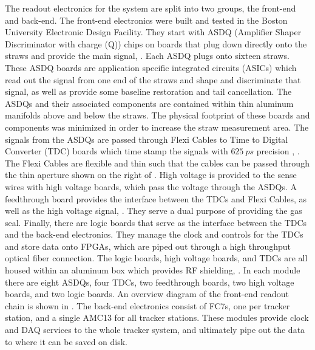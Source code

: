 The readout electronics for the system are split into two groups, the front-end and back-end. The front-end electronics were built and tested in the Boston University Electronic Design Facility. They start with ASDQ (Amplifier Shaper Discriminator with charge (Q)) chips on boards that plug down directly onto the straws and provide the main signal, . Each ASDQ plugs onto sixteen straws. These ASDQ boards are application specific integrated circuits (ASICs) which read out the signal from one end of the straws and shape and discriminate that signal, as well as provide some baseline restoration and tail cancellation. The ASDQs and their associated components are contained within thin aluminum manifolds above and below the straws. The physical footprint of these boards and components was minimized in order to increase the straw measurement area. The signals from the ASDQs are passed through Flexi Cables to Time to Digital Converter (TDC) boards which time stamp the signals with $\SI{625}{ps}$ precision \cite{WTThesis}, . The Flexi Cables are flexible and thin such that the cables can be passed through the thin aperture shown on the right of . High voltage is provided to the sense wires with high voltage boards, which pass the voltage through the ASDQs. A feedthrough board provides the interface between the TDCs and Flexi Cables, as well as the high voltage signal, . They serve a dual purpose of providing the gas seal. Finally, there are logic boards that serve as the interface between the TDCs and the back-end electronics. They manage the clock and controls for the TDCs and store data onto FPGAs, which are piped out through a high throughput optical fiber connection. The logic boards, high voltage boards, and TDCs are all housed within an aluminum box which provides RF shielding, . In each module there are eight ASDQs, four TDCs, two feedthrough boards, two high voltage boards, and two logic boards. An overview diagram of the front-end readout chain is shown in . The back-end electronics consist of FC7s, one per tracker station, and a single AMC13 for all tracker stations. These modules provide clock and DAQ services to the whole tracker system, and ultimately pipe out the data to where it can be saved on disk.



